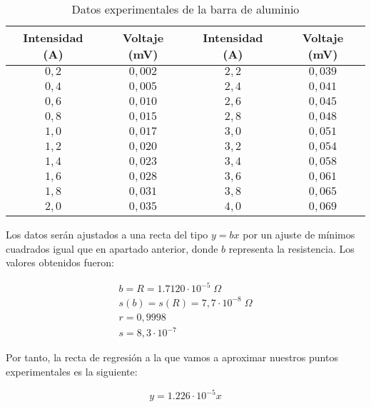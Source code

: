 \documentclass[a4paper,12pt,titlepage]{article}
\begin{document}
\begin{table}[h!]
    \centering
    \begin{tabular}{|c|c|c|c|}
        \hline
        Intensidad (A) & Voltaje (mV) & Intensidad (A) & Voltaje (mV) \\
        \hline
        $0,2$ & $0,002$ & $2,2$ & $0,039$ \\
        \hline
        $0,4$ & $0,005$ & $2,4$ & $0,041$ \\
        \hline
        $0,6$ & $0,010$ & $2,6$ & $0,045$ \\
        \hline
        $0,8$ & $0,015$ & $2,8$ & $0,048$ \\
        \hline
        $1,0$ & $0,017$ & $3,0$ & $0,051$ \\
        \hline
        $1,2$ & $0,020$ & $3,2$ & $0,054$ \\
        \hline
        $1,4$ & $0,023$ & $3,4$ & $0,058$ \\
        \hline
        $1,6$ & $0,028$ & $3,6$ & $0,061$ \\
        \hline
        $1,8$ & $0,031$ & $3,8$ & $0,065$ \\
        \hline
        $2,0$ & $0,035$ & $4,0$ & $0,069$ \\
        \hline
    \end{tabular}
    \caption{Datos experimentales de la barra de aluminio}
\end{table}

Los datos serán ajustados a una recta del tipo $y=bx$ por un ajuste de mínimos cuadrados igual que en apartado anterior, donde $b$ representa la resistencia. Los valores obtenidos fueron:

\begin{equation}
    \begin{gathered}
        b = R = 1.7120 \cdot 10^{-5} \; \Omega \\
        s(b) = s(R) = 7,7 \cdot 10^{-8} \; \Omega\\
        r = 0,9998 \\
        s = 8,3\cdot 10^{-7}
    \end{gathered}
\end{equation}

Por tanto, la recta de regresión a la que vamos a aproximar nuestros puntos experimentales es la siguiente:

\begin{equation}
    y = 1.226 \cdot 10^{-5}x
\end{equation}
\end{document}
